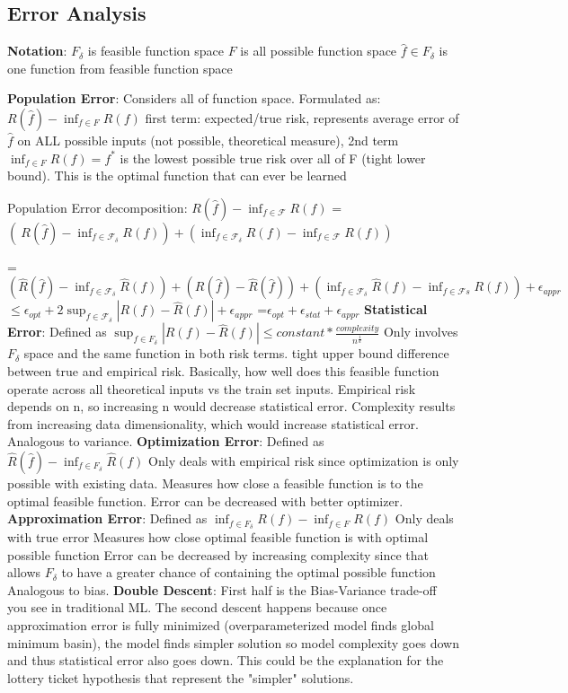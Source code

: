 \subsection*{Error Analysis}
\textbf{Notation}:
$F_{\delta}$ is feasible function space
$F$ is all possible function space
$\hat f \in F_\delta$ is one function from feasible function space

\textbf{Population Error}: 
Considers all of function space. Formulated as: 
$R(\hat f) - \inf_{f \in F}R(f)$
first term: expected/true risk, represents average error of $\hat f$ on ALL possible inputs (not possible, theoretical measure), 2nd term $\inf_{f \in F} R(f) = f^{*}$ is the lowest possible true risk over all of F (tight lower bound). This is the optimal function that can ever be learned

Population Error decomposition: 
$ R(\hat f) - \inf_{f \in \mathcal{F}} R(f) $
=$\left(\ R(\hat f) - \inf_{f \in \mathcal{F}_{\delta}} R(f) \right) + \left( \inf_{f \in \mathcal{F}_{\delta}} R(f) - \inf_{f \in \mathcal{F}} R(f) \right) $

=$\left(\hat R(\hat f) - \inf_{f \in \mathcal{F}_{\delta}}\hat R(f) \right) + \left( R(\hat f) - \hat{R}(\hat f) \right) + \left( \inf_{f \in \mathcal{F}_{\delta}}\hat R(f) - \inf_{f \in \mathcal{F}s} {R}(f) \right) + \epsilon_{appr} $
$ \leq \epsilon_{opt} + 2\sup_{f \in \mathcal{F}_{\delta}} \left| R(f) - \hat{R}(f) \right| + \epsilon_{appr} $
=$\epsilon_{opt} + \epsilon_{stat} + \epsilon_{appr} $
\textbf{Statistical Error}: 
Defined as $\sup_{f \in F_{\delta}} |R(f) - \hat R(f)| \leq constant*\frac{complexity}{n^\frac{1}{d}}$ 
Only involves $F_\delta$ space and the same function in both risk terms.
tight upper bound difference between true and empirical risk.
Basically, how well does this feasible function operate across all theoretical inputs vs the train set inputs.
Empirical risk depends on n, so increasing n would decrease statistical error.
Complexity results from increasing data dimensionality, which would increase statistical error.
Analogous to variance. 
\textbf{Optimization Error}: 
Defined as $\hat R (\hat f) - \inf_{f \in F_{\delta}} \hat R(f)$
Only deals with empirical risk since optimization is only possible with existing data.
Measures how close a feasible function is to the optimal feasible function.
Error can be decreased with better optimizer.
\textbf{Approximation Error}: 
Defined as  $\inf_{f \in F_{\delta}} R(f) - \inf_{f \in F} R(f)$
Only deals with true error 
Measures how close optimal feasible function is with optimal possible function
Error can be decreased by increasing complexity since that allows $F_{\delta}$ to have a greater chance of containing the optimal possible function
Analogous to bias.
\textbf{Double Descent}: 
First half is the Bias-Variance trade-off you see in traditional ML.
The second descent happens because once approximation error is fully minimized (overparameterized model finds global minimum basin), the model finds simpler solution so model complexity goes down and thus statistical error also goes down. This could be the explanation for the lottery ticket hypothesis that represent the "simpler" solutions.
